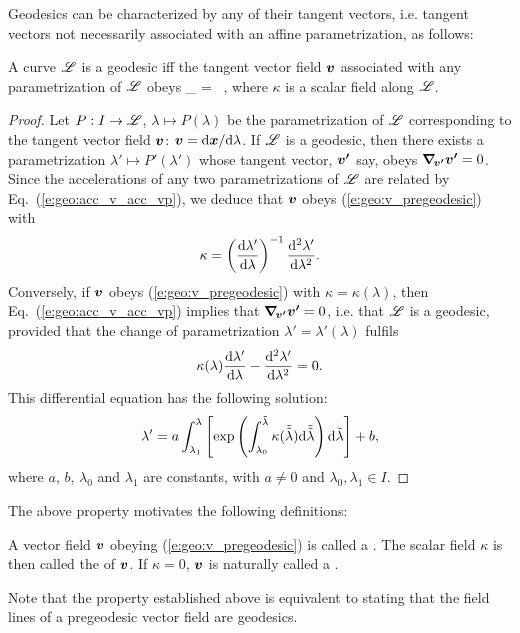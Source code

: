 Geodesics can be characterized by any of their tangent vectors, i.e.
tangent vectors not necessarily associated with an affine parametrization, as follows:
\begin{greybox}
A curve $\mathscr{L}$ is a geodesic
iff the tangent vector field $\bm{v}$ associated with any parametrization
of $\mathscr{L}$ obeys
\be \label{e:geo:v_pregeodesic}
    \wnab_{\!} = \kappa\,  ,
\ee
where $\kappa$ is a scalar field along $\mathscr{L}$.
\end{greybox}
\begin{proof}
Let $P: I\to \mathscr{L}$, $\lambda\mapsto P(\lambda)$ be the parametrization of $\mathscr{L}$
corresponding to the tangent vector field $\bm{v}$: $\bm{v} = \mathrm{d}\bm{x}/\mathrm{d}\lambda$.
If $\mathscr{L}$ is a geodesic, then there exists a parametrization
$\lambda'\mapsto P'(\lambda')$ whose tangent vector, $\bm{v'}$ say, obeys
$\bm{\nabla}_{\!\bm{v'}}\bm{v'} = 0$. Since the accelerations of any two parametrizations of $\mathscr{L}$
are related by Eq.~(\ref{e:geo:acc_v_acc_vp}), we deduce that $\bm{v}$ obeys
(\ref{e:geo:v_pregeodesic}) with
\[
    \kappa = \left( \frac{\mathrm{d}\lambda'}{\mathrm{d}\lambda} \right)^{-1}
        \frac{\mathrm{d}^2\lambda'}{\mathrm{d}\lambda^2} .
\]
Conversely, if $\bm{v}$ obeys (\ref{e:geo:v_pregeodesic}) with $\kappa=\kappa(\lambda)$,
then Eq.~(\ref{e:geo:acc_v_acc_vp}) implies that $\bm{\nabla}_{\!\bm{v'}}\bm{v'} = 0$,
i.e. that $\mathscr{L}$ is a geodesic, provided that the change of
parametrization $\lambda' = \lambda'(\lambda)$ fulfils
\[
    \kappa(\lambda) \frac{\mathrm{d}\lambda'}{\mathrm{d}\lambda} -  \frac{\mathrm{d}^2\lambda'}{\mathrm{d}\lambda^2} = 0 .
\]
This differential equation has the following solution:
\[
    \lambda' = a \int_{\lambda_1}^\lambda \left[ \exp \left(
    \int_{\lambda_0}^{\tilde{\lambda}} \kappa(\tilde{\tilde{\lambda}})
    \mathrm{d}\tilde{\tilde{\lambda}}\right) \mathrm{d}\tilde\lambda
    \right] + b,
\]
where $a$, $b$, $\lambda_0$ and $\lambda_1$ are constants, with $a\not = 0$ and $\lambda_0,\lambda_1\in I$.
\end{proof}
The above property motivates the following definitions:
\begin{greybox}
A vector field $\bm{v}$ obeying (\ref{e:geo:v_pregeodesic}) is called
a .
The scalar field $\kappa$ is then called the  of $\bm{v}$.
If $\kappa=0$, $\bm{v}$ is naturally called a .
\end{greybox}
Note that the property established above is equivalent to stating that the
field lines of a pregeodesic vector field are geodesics.

